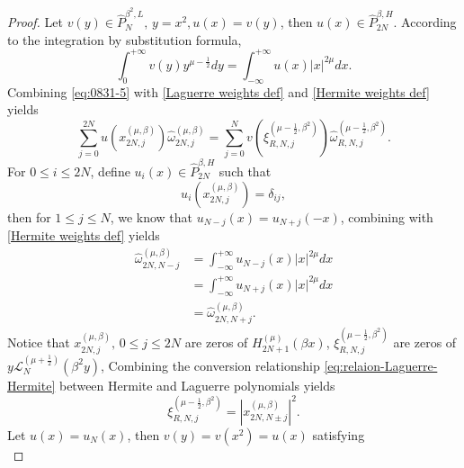 \documentclass[pdflatex,sn-aps]{sn-jnl}%
\theoremstyle{thmstyleone}%
\theoremstyle{thmstyletwo}%
\theoremstyle{thmstylethree}%
\begin{document}
\begin{appendices}
\begin{proof}
  Let $v(y) \in \widehat{P}_N^{\beta^2, L},\, y = x^2, u(x) = v(y)$, then
  $u(x) \in \widehat{P}_{2N}^{\beta, H}$. According to the integration by substitution formula,
  \begin{equation}\label{eq:0831-5}
    \int_0^{+\infty} v(y) y^{\mu-\frac{1}{2}} d y=\int_{-\infty}^{+\infty} u(x)|x|^{2 \mu} d x.
  \end{equation}
  Combining \eqref{eq:0831-5} with \eqref{Laguerre weights def} and
  \eqref{Hermite weights def} yields
  \begin{equation}\label{eq:0831-6}
    \sum_{j=0}^{2 N} u\left(x_{2 N, j}^{(\mu, \beta)}\right) \widehat{\omega}_{2 N, j}^{(\mu, \beta)}=\sum_{j=0}^N v\left(\xi_{R, N, j}^{\left(\mu-\frac{1}{2}, \beta^2\right)}\right) \widehat{\omega}_{R,N,j}^{\left(\mu-\frac{1}{2},\beta^2\right)}.
  \end{equation}
  For $0 \leqslant i \leqslant 2N$, define $u_i(x) \in \widehat{P}_{2 N}^{\beta, H}$ such that
  \begin{equation}\label{eq:0903-7}
    u_i\left(x_{2 N, j}^{(\mu, \beta)}\right)=\delta_{i j},
  \end{equation}
  then for $1 \leqslant j \leqslant N$, we know that $u_{N-j}(x) = u_{N+j}(-x)$, combining
  with \eqref{Hermite weights def} yields
  \begin{equation}\label{eq:0903-8}
    \begin{aligned}
    \widehat{\omega}_{2 N, N-j}^{\left(\mu, \beta\right)} & =\int_{-\infty}^{+\infty} u_{N-j}(x)|x|^{2 \mu} d x \\
    & =\int_{-\infty}^{+\infty} u_{N+j}(x)|x|^{2 \mu} d x \\
    & =\widehat{\omega}_{2 N, N+j}^{\left(\mu, \beta\right)}.
    \end{aligned}
  \end{equation}
  Notice that
  $x_{2N,j}^{\left(\mu,\beta\right)},\, 0\leqslant j \leqslant 2N$ are zeros of
  $H_{2N+1}^{(\mu)}(\beta x)$, $\xi_{R,N,j}^{\left(\mu-\frac{1}{2},\beta^2\right)}$ are
  zeros of $y\mathscr{L}_N^{\left(\mu+\frac{1}{2}\right)}(\beta^2 y)$, Combining the 
  conversion relationship \eqref{eq:relaion-Laguerre-Hermite} between Hermite and Laguerre polynomials yields
  \begin{equation}\label{eq:0831-4}
    \xi_{R, N, j}^{\left(\mu-\frac{1}{2}, \beta^2\right)}=\left|x_{2 N, N \pm j}^{(\mu, \beta)}\right|^2.
  \end{equation}
  Let $u(x) = u_N(x)$, then $v(y)=v(x^2)=u(x)$ satisfying
  \begin{displaymath}

\end{displaymath}
\end{proof}
\end{appendices}
\end{document}
